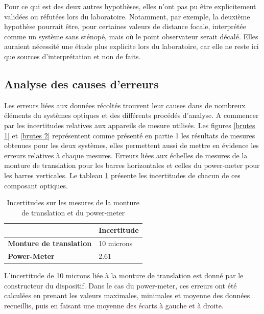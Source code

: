 \documentclass[11pt,letterpaper]{article}
\begin{document}
Pour ce qui est des deux autres hypothèses, elles n'ont pas pu être explicitement validées ou réfutées lors du laboratoire. Notamment, par exemple, la deuxième hypothèse pourrait être, pour certaines valeurs de distance focale, interprétée comme un système sans sténopé, mais où le point observateur serait décalé. Elles auraient nécessité une étude plus explicite lors du laboratoire, car elle ne reste ici que sources d'interprétation et non de faits. 

\subsection{Analyse des causes d'erreurs}

Les erreurs liées aux données récoltés trouvent leur causes dans de nombreux éléments du systèmes optiques et des différents procédés d'analyse. A commencer par les incertitudes relatives aux appareils de mesure utilisés. Les figures \ref{brutes 1} et \ref{brutes 2} représentent comme présenté en partie 1 les résultats de mesures obtenues pour les deux systèmes, elles permettent aussi de mettre en évidence les erreurs relatives à chaque mesures. Erreurs liées aux échelles de mesures de la monture de translation pour les barres horizontales et celles du power-meter pour les barres verticales. Le tableau \ref{incertitudes} présente les incertitudes de chacun de ces composant optiques. 

\begin{table}[H]
\centering
\begin{tabular}{|p{4.8cm}|p{4.2cm}|}
\cline{2-2}
\multicolumn{1}{c|}{} & \textbf{Incertitude} \\
\hline
\textbf{Monture de translation} & 10 microns\\
\hline
\textbf{Power-Meter} & 2.61\\
\hline
\end{tabular}
\caption{Incertitudes sur les mesures de la monture de translation et du power-meter}
\label{incertitudes}
\end{table}

L'incertitude de 10 microns liée à la monture de translation est donné par le constructeur du dispositif. Dans le cas du power-meter, ces erreurs ont été calculées en prenant les valeurs maximales, minimales et moyenne des données recueillis, puis en faisant une moyenne des écarts à gauche et à droite.
\end{document}
